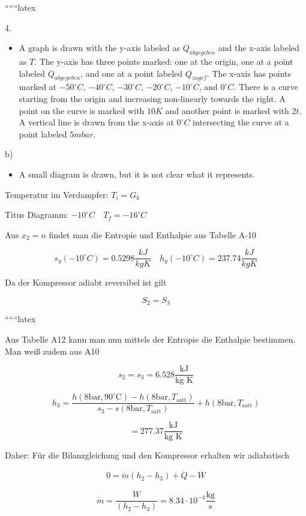 
``````latex


4.

\begin{itemize}
    \item A graph is drawn with the y-axis labeled as $Q_{abgegeben}$ and the x-axis labeled as $T$. The y-axis has three points marked: one at the origin, one at a point labeled $Q_{abgegeben}$, and one at a point labeled $Q_{zugef}$. The x-axis has points marked at $-50^\circ C$, $-40^\circ C$, $-30^\circ C$, $-20^\circ C$, $-10^\circ C$, and $0^\circ C$. There is a curve starting from the origin and increasing non-linearly towards the right. A point on the curve is marked with $10K$ and another point is marked with $2t$. A vertical line is drawn from the x-axis at $0^\circ C$ intersecting the curve at a point labeled $5mbar$.
\end{itemize}

b)

\begin{itemize}
    \item A small diagram is drawn, but it is not clear what it represents.
\end{itemize}

Temperatur im Verdampfer: $T_i = G_k$

Titus Diagramm: $-10^\circ C \quad T_f = -16^\circ C$

Aus $x_2 = n$ findet man die Entropie und Enthalpie aus Tabelle A-10

\[
s_g(-10^\circ C) = 0.5298 \frac{kJ}{kgK} \quad h_g(-10^\circ C) = 237.74 \frac{kJ}{kgK}
\]

Da der Kompressor adiabt reversibel ist gilt

\[
S_2 = S_3
\]

``````latex


Aus Tabelle A12 kann man nun mittels der Entropie die Enthalpie bestimmen. Man weiß zudem aus A10

\[
s_2 = s_3 = 6.528 \frac{\text{kJ}}{\text{kg K}}
\]

\[
h_3 = \frac{h(8 \text{bar}, 90^\circ \text{C}) - h(8 \text{bar}, T_{\text{satt}})}{s_3 - s(8 \text{bar}, T_{\text{satt}})} + h(8 \text{bar}, T_{\text{satt}})
\]

\[
= 277.37 \frac{\text{kJ}}{\text{kg K}}
\]

Daher: Für die Bilanzgleichung und den Kompressor erhalten wir adiabatisch

\[
0 = \dot{m} (h_2 - h_3) + \dot{Q} - \dot{W}
\]

\[
\dot{m} = \frac{\dot{W}}{(h_2 - h_3)} = 8.34 \cdot 10^{-4} \frac{\text{kg}}{\text{s}}
\]

